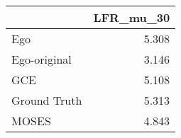 \begin{tabular}{lr}
\toprule
{} & LFR_mu_30 \\
\midrule
Ego          &     5.308 \\
Ego-original &     3.146 \\
GCE          &     5.108 \\
Ground Truth &     5.313 \\
MOSES        &     4.843 \\
\bottomrule
\end{tabular}
